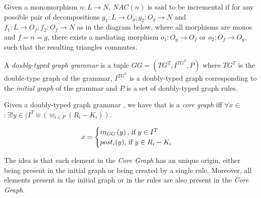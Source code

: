 \begin{definition} Given a monomorphism \mbox{$n : L \rightarrow N$}, $NAC(n)$ is said to be incremental if for any possible pair of decompositions \mbox{$g_1 : L \rightarrow O_g;g_2 : O_g \rightarrow N$} and \mbox{$f_1 : L \rightarrow O_f;f_2 : O_f \rightarrow N$} as in the diagram below, where all morphisms are monos and $f = n = g$, there exists a mediating morphism $o_1 : O_g \rightarrow O_f$ or $o_2 : O_f \rightarrow O_g$, such that the resulting triangles
  commutes.


\end{definition}

\begin{example} 


\end{example}

\begin{definition} A \emph{doubly-typed graph grammar} is a tuple $GG = \left(TG^T, I^{TG^T},P \right)$ where $TG^T$ is the double-type graph of the grammar, $I^{TG^T}$ is a doubly-typed graph corresponding to the \emph{initial graph} of the grammar and $P$ is a set of doubly-typed graph rules. 
\end{definition}

\begin{example}
\end{example}

\begin{definition} Given a doubly-typed graph grammar \doublyTypedGraphGrammarCore{}, we have that \coreGraph{} is a \emph{core graph} iff \mbox{$\forall x \in$ \coreGraph $: \exists! y \in (I^T \uplus (\uplus_{i \in P} (R_i - K_i))$}.


\[ x =
    \begin{cases}
      in_{GG}\parens{y},$ if $y \in I^T\\
      post_i(y),$ if $y \in R_i - K_i\\
    \end{cases}
   \]

  \begin{intuition} The idea is that each element in the \emph{Core Graph} has an unique origin, either being present in the initial graph or being created by a single rule. Moreover, all elements present in the initial graph or in the rules are also present in the \emph{Core Graph}.
\end{intuition}


\end{definition}

